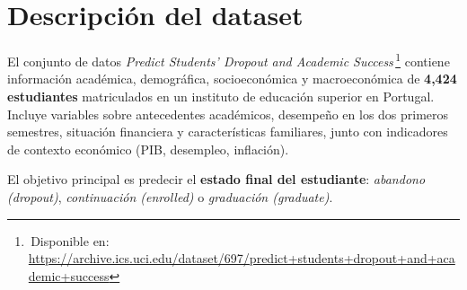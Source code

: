 \documentclass[10pt]{article}
\begin{document}
\section*{Descripción del dataset}

El conjunto de datos \textit{Predict Students' Dropout and Academic Success}\,\footnote{\,Disponible en: \url{https://archive.ics.uci.edu/dataset/697/predict+students+dropout+and+academic+success}} contiene información académica, demográfica, socioeconómica y macroeconómica de \textbf{4,424 estudiantes} matriculados en un instituto de educación superior en Portugal. Incluye variables sobre antecedentes académicos, desempeño en los dos primeros semestres, situación financiera y características familiares, junto con indicadores de contexto económico (PIB, desempleo, inflación). 

El objetivo principal es predecir el \textbf{estado final del estudiante}: \textit{abandono (dropout)}, \textit{continuación (enrolled)} o \textit{graduación (graduate)}.
	
\end{document}
